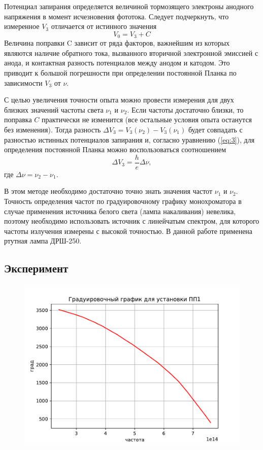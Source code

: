 Потенциал запирания определяется величиной тормозящего электроны анодного напряжения в момент исчезновения фототока. Следует подчеркнуть, что измеренное $V_{3}$ отличается от истинного значения
\begin{equation}
	V_0=V_{3}+C
\end{equation}
Величина поправки C зависит от ряда факторов, важнейшим из которых являются наличие обратного тока, вызванного вторичной электронной эмиссией с анода, и контактная разность потенциалов между анодом и катодом. Это приводит к большой погрешности 
при определении постоянной Планка по зависимости $V_{3}$ от $\nu$.

С целью увеличения точности опыта можно провести измерения для двух близких значений частоты света $\nu_1$ и $\nu_2$. Если частоты достаточно близки, то поправка $C$ практически не изменится (все остальные условия опыта останутся без изменения). Тогда разность $\Delta V_{3} = V_{3}(\nu_2)- V_{3}(\nu_1)$ будет совпадать с разностью истинных потенциалов запирания и, согласно уравнению (\ref{eq:3}), для определения постоянной Планка можно воспользоваться соотношением
\begin{equation}
	\Delta V_{3}=\frac he \Delta \nu,
\end{equation}
где $\Delta \nu= \nu_2- \nu_1$.

В этом методе необходимо достаточно точно знать значения частот $\nu_1$ и $\nu_2$. Точность определения частот по градуировочному графику монохроматора в случае применения источника белого света (лампа накаливания) невелика, поэтому необходимо использовать источник с линейчатым спектром, для которого частоты излучения измерены с высокой точностью. В данной работе применена ртутная лампа ДРШ-250. 

\subsection{Эксперимент}
\begin{figure}[H]
	\centering
	\includegraphics[scale=1]{scripts/Gradgraph.pdf}
	\caption{}
	\label{fig:8}
\end{figure}

